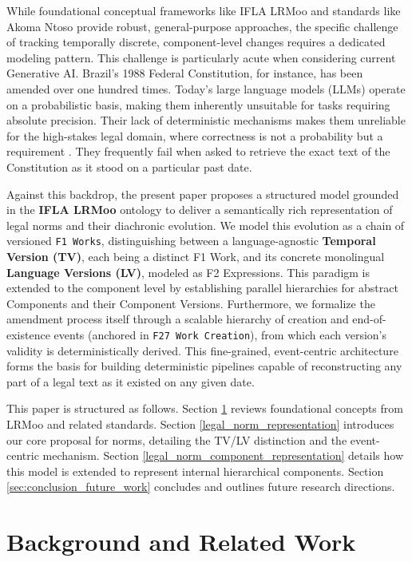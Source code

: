 \documentclass[11pt]{article}
\begin{document}
While foundational conceptual frameworks like IFLA LRMoo \cite{lrmoo2024} and standards like Akoma Ntoso \cite{palmirani2011akoma} provide robust, general-purpose approaches, the specific challenge of tracking temporally discrete, component-level changes requires a dedicated modeling pattern. This challenge is particularly acute when considering current Generative AI. Brazil’s 1988 Federal Constitution, for instance, has been amended over one hundred times. Today's large language models (LLMs) operate on a probabilistic basis, making them inherently unsuitable for tasks requiring absolute precision. Their lack of deterministic mechanisms makes them unreliable for the high-stakes legal domain, where correctness is not a probability but a requirement \cite{padiu2024extent,lai2023large}. They frequently fail when asked to retrieve the exact text of the Constitution as it stood on a particular past date.

Against this backdrop, the present paper proposes a structured model grounded in the \textbf{IFLA LRMoo} ontology to deliver a semantically rich representation of legal norms and their diachronic evolution. We model this evolution as a chain of versioned \texttt{F1 Works}, distinguishing between a language-agnostic \textbf{Temporal Version (TV)}, each being a distinct F1 Work, and its concrete monolingual \textbf{Language Versions (LV)}, modeled as F2 Expressions. This paradigm is extended to the component level by establishing parallel hierarchies for abstract Components and their Component Versions. Furthermore, we formalize the amendment process itself through a scalable hierarchy of creation and end-of-existence events (anchored in \texttt{F27 Work Creation}), from which each version's validity is deterministically derived. This fine-grained, event-centric architecture forms the basis for building deterministic pipelines capable of reconstructing any part of a legal text as it existed on any given date.

This paper is structured as follows. Section \ref{fundamental_concepts} reviews foundational concepts from LRMoo and related standards. Section \ref{legal_norm_representation} introduces our core proposal for norms, detailing the TV/LV distinction and the event-centric mechanism. Section \ref{legal_norm_component_representation} details how this model is extended to represent internal hierarchical components. Section \ref{sec:conclusion_future_work} concludes and outlines future research directions.

\section{Background and Related Work}
\label{fundamental_concepts}
\end{document}
